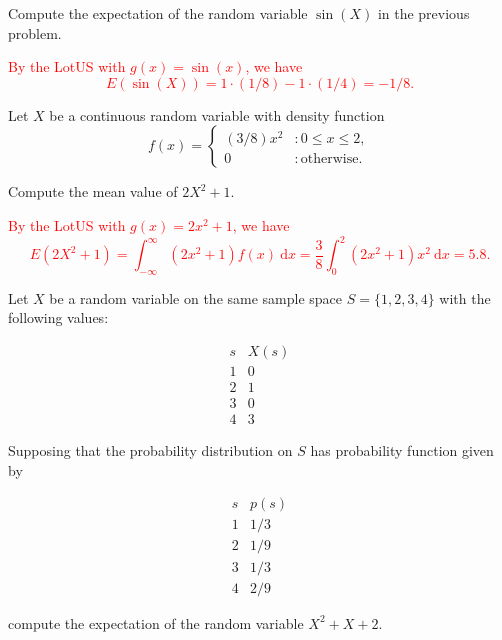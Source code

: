 \documentclass[12pt,reqno]{amsart}
\begin{document}
\bigskip
\prob Compute the expectation of the random variable $\sin(X)$ in the previous problem.

\bigskip
\textcolor{red}{By the LotUS with $g(x) = \sin(x)$, we have
    \[E(\sin(X)) = 1 \cdot( 1/8) -1 \cdot (1/4) = -1/8.\]}











\bigskip
\prob Let $X$ be a continuous random variable with density function
\[f(x) = \begin{cases}
    (3/8)x^2 & : 0 \leq x \leq 2, \\
    0 & : \text{otherwise}.
\end{cases}\]

Compute the mean value of $2X^2+1$.

\bigskip
\textcolor{red}{By the LotUS with $g(x) = 2x^2+1$, we have
    \[E(2X^2+1) = \int_{-\infty}^\infty(2x^2+1)f(x) \ \text{d} x = \frac{3}{8} \int_0^2 (2x^2+1)x^2 \ \text{d} x = 5.8.\]}













\bigskip
\prob Let $X$ be a random variable on the same sample space $S = \{1,2,3,4\}$ with the following values:

\[\begin{array}{c|c}
    s & X(s)  \\ \hline
    1 & 0  \\
    2 & 1  \\
    3 & 0 \\
    4 & 3
\end{array}\]

Supposing that the probability distribution on $S$ has probability function given by

\[\begin{array}{c|c}
    s & p(s)  \\ \hline
    1 & 1/3  \\
    2 & 1/9  \\
    3 & 1/3 \\
    4 & 2/9
\end{array}\]

compute the expectation of the random variable $X^2 + X + 2$.
\end{document}
